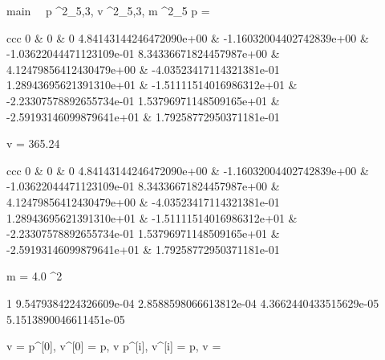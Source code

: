 \documentclass[12pt,a4paper]{book}
\begin{document}
\begin{eqcode}{main}{\ }{\ }{}
    p \in {}^2_{5,3},
    v \in {}^2_{5,3},
    m \in {}^2_{5} \lend
    p = \begin{tmatrix}{ccc}
            0 & 0 & 0 \lend
            4.84143144246472090e+00 & -1.16032004402742839e+00 &
            -1.03622044471123109e-01 \lend
            8.34336671824457987e+00 & 4.12479856412430479e+00 &
            -4.03523417114321381e-01 \lend
            1.28943695621391310e+01 & -1.51111514016986312e+01 &
            -2.23307578892655734e-01 \lend
            1.53796971148509165e+01 & -2.59193146099879641e+01 &
            1.79258772950371181e-01 \lend
        \end{tmatrix} \lend
    v = 365.24 \cdot
        \begin{tmatrix}{ccc}
            0 & 0 & 0 \lend
            4.84143144246472090e+00 & -1.16032004402742839e+00 &
            -1.03622044471123109e-01 \lend
            8.34336671824457987e+00 & 4.12479856412430479e+00 &
            -4.03523417114321381e-01 \lend
            1.28943695621391310e+01 & -1.51111514016986312e+01 &
            -2.23307578892655734e-01 \lend
            1.53796971148509165e+01 & -2.59193146099879641e+01 &
            1.79258772950371181e-01 \lend
        \end{tmatrix} \lend
    m = 4.0 \cdot \pi^2 \cdot
        \begin{tvector}
            1 \lend
            9.5479384224326609e-04 \lend
            2.8588598066613812e-04 \lend
            4.3662440433515629e-05 \lend
            5.1513890046611451e-05 \lend
        \end{tvector} \lend
    v =  \lend
     \lend
    p^{[0]}, v^{[0]} = p, v \lend
    p^{[i]}, v^{[i]} =  \lend
    p, v =  \lend
     \lend
     \lend
\end{eqcode}
\end{document}
